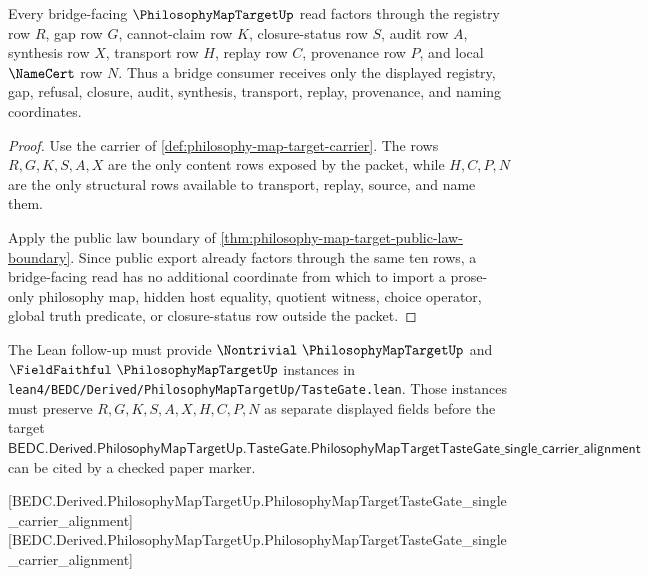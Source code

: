 \begin{theorem}
\label{thm:philosophy-map-target-bridge-ledger}
Every bridge-facing $\PhilosophyMapTargetUp$ read factors through the registry row $R$, gap row $G$, cannot-claim row $K$, closure-status row $S$, audit row $A$, synthesis row $X$, transport row $H$, replay row $C$, provenance row $P$, and local $\NameCert$ row $N$. Thus a bridge consumer receives only the displayed registry, gap, refusal, closure, audit, synthesis, transport, replay, provenance, and naming coordinates.
\end{theorem}
\begin{proof}
Use the carrier of \autoref{def:philosophy-map-target-carrier}. The rows $R,G,K,S,A,X$ are the only content rows exposed by the packet, while $H,C,P,N$ are the only structural rows available to transport, replay, source, and name them.

Apply the public law boundary of \autoref{thm:philosophy-map-target-public-law-boundary}. Since public export already factors through the same ten rows, a bridge-facing read has no additional coordinate from which to import a prose-only philosophy map, hidden host equality, quotient witness, choice operator, global truth predicate, or closure-status row outside the packet.
\end{proof}

The Lean follow-up must provide $\Nontrivial\ \PhilosophyMapTargetUp$ and $\FieldFaithful\ \PhilosophyMapTargetUp$ instances in \texttt{lean4/BEDC/Derived/PhilosophyMapTargetUp/TasteGate.lean}. Those instances must preserve $R,G,K,S,A,X,H,C,P,N$ as separate displayed fields before the target $\mathsf{BEDC.Derived.PhilosophyMapTargetUp.TasteGate.PhilosophyMapTargetTasteGate\_single\_carrier\_alignment}$ can be cited by a checked paper marker.

[BEDC.Derived.PhilosophyMapTargetUp.PhilosophyMapTargetTasteGate\_single\_carrier\_alignment]
[BEDC.Derived.PhilosophyMapTargetUp.PhilosophyMapTargetTasteGate\_single\_carrier\_alignment]

